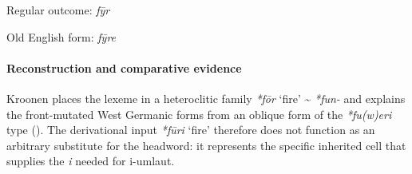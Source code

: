 \documentclass[
  british,
  a4paper,
]{article}
\providecommand{\Recon}[1]{\emph{*#1}}
\begin{document}
\noindent{} \endgroup

Regular outcome: \emph{fȳr}

Old English form: \emph{fȳre}

\paragraph{Reconstruction and comparative
evidence}\label{reconstruction-and-comparative-evidence-147}

Kroonen places the lexeme in a heteroclitic family \Recon{fōr} `fire'
\textasciitilde{} \emph{*fun-} and explains the front-mutated West
Germanic forms from an oblique form of the \emph{*fu(w)eri} type
(). The derivational input
\Recon{fūri} `fire' therefore does not function as an arbitrary
substitute for the headword: it represents the specific inherited cell
that supplies the \emph{i} needed for i-umlaut.
\end{document}
